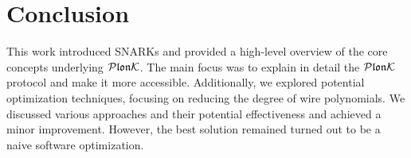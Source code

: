 \chapter*{Conclusion}

This work introduced SNARKs and provided a high-level overview of the core concepts underlying $\mathcal{P}\mathfrak{lon}\mathcal{K}$. The main focus was to explain in detail the $\mathcal{P}\mathfrak{lon}\mathcal{K}$ protocol and make it more accessible. Additionally, we explored potential optimization techniques, focusing on reducing the degree of wire polynomials. We discussed various approaches and their potential effectiveness and achieved a minor improvement. However, the best solution remained turned out to be a naive software optimization.
